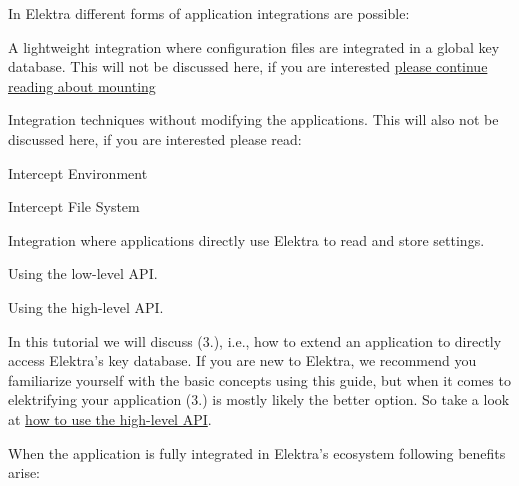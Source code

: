In Elektra different forms of application integrations are possible\+:


\begin{DoxyEnumerate}
\item A lightweight integration where configuration files are integrated in a global key database. This will not be discussed here, if you are interested \hyperlink{doc_tutorials_mount_md}{please continue reading about mounting}
\item Integration techniques without modifying the applications. This will also not be discussed here, if you are interested please read\+:
\begin{DoxyItemize}
\item Intercept Environment
\item Intercept File System
\end{DoxyItemize}
\item Integration where applications directly use Elektra to read and store settings.
\begin{DoxyEnumerate}
\item Using the low-\/level A\+PI.
\item Using the high-\/level A\+PI.
\end{DoxyEnumerate}
\end{DoxyEnumerate}

In this tutorial we will discuss (3.), i.\+e., how to extend an application to directly access Elektra’s key database. If you are new to Elektra, we recommend you familiarize yourself with the basic concepts using this guide, but when it comes to elektrifying your application (3.) is mostly likely the better option. So take a look at \hyperlink{doc_tutorials_highlevel_md}{how to use the high-\/level A\+PI}.

When the application is fully integrated in Elektra’s ecosystem following benefits arise\+:



